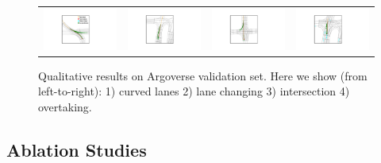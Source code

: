 \begin{figure}[t]
\centering
\setlength{\tabcolsep}{1pt}
\begin{tabular}{cccc}
\includegraphics[width=0.24\linewidth]{figures/vis1.pdf}
&\includegraphics[width=0.24\linewidth]{figures/vis2.pdf}
&\includegraphics[width=0.24\linewidth]{figures/vis3.pdf}
&\includegraphics[width=0.24\linewidth]{figures/vis4.pdf}

\end{tabular}
\caption{Qualitative results on Argoverse validation set. Here we show (from
left-to-right): 1) curved lanes 2) lane changing 3) intersection 4) overtaking.}
\label{fig:vis}
\end{figure}

\subsection{Ablation Studies}





